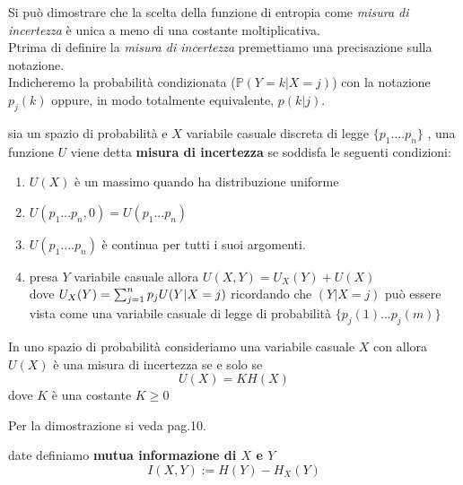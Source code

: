 Si può dimostrare che la scelta della funzione di entropia come \textit{misura di incertezza} è unica a meno di una costante moltiplicativa.\\
Ptrima di definire la \textit{misura di incertezza} premettiamo una precisazione sulla notazione.\\
Indicheremo la probabilità condizionata ($\mathbb{P}(Y=k|X=j)$) con la notazione $p_{j}(k)$ oppure, in modo totalmente equivalente, $p(k|j)$.
\begin{defi} \label{defi:misuraincertezza}
sia \spacep un spazio di probabilità e $X$ variabile casuale discreta di legge $\{ p_1....p_n \}$ , una funzione $U$ viene detta \textbf{misura di incertezza} se soddisfa le seguenti condizioni:
\begin{enumerate}
\item $U(X)$ è un massimo quando ha distribuzione uniforme
\item $U(p_1...p_n,0)=U(p_1...p_n)$
\item $U(p_1....p_n)$ è continua per tutti i suoi argomenti.
\item presa $Y$ variabile casuale allora $U(X,Y)=U_X(Y)+U(X)$\\
 dove $U_X(Y)= \sum_{j=1}^n p_j U(Y|X=j)$ ricordando che $(Y|X=j)$ può essere vista come una variabile casuale di legge di probabilità  $\{ p_j(1)...p_j(m) \}$ 
\end{enumerate}
\end{defi}

\begin{teo} \label{teo:misuraIncertezza}
In uno spazio di probabilità \spacep consideriamo una variabile casuale $X$ con \lep allora\\
$U(X)$ è una misura di incertezza se e solo se 
$$U(X)= KH(X)$$
dove $K$ è una costante $K\geq 0$
\end{teo}
Per la dimostrazione si veda \cite{Khinchin} pag.10.


\begin{defi} \label{defin:mutua}
date \var definiamo \textbf{mutua informazione di $X$ e $Y$}
\begin{equation} \label{defi:mutua}
I(X,Y):=H(Y)-H_X(Y)
\end{equation}
\end{defi}

